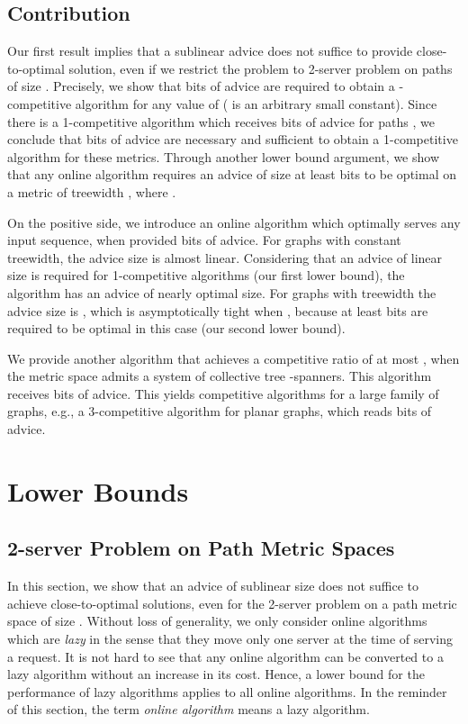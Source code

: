 \subsection{Contribution}
Our first result implies that a sublinear advice does not suffice to provide close-to-optimal solution, even if we restrict the problem to 2-server problem on paths of size . Precisely, we show that  bits of advice are required to obtain a -competitive algorithm for any value of  ( is an arbitrary small constant). Since there is a 1-competitive algorithm which receives  bits of advice for paths \cite{WAOA11}, we conclude that  bits of advice are necessary and sufficient to obtain a 1-competitive algorithm for these metrics.
Through another lower bound argument, we show that any online algorithm requires an advice of size at least  bits to be optimal on a metric of treewidth , where .

On the positive side, we introduce an online algorithm which optimally serves any input sequence, when provided  bits of advice. For graphs with constant treewidth, the advice size is almost linear. Considering that an advice of linear size is required for 1-competitive algorithms (our first lower bound), the algorithm has an advice of nearly optimal size.
For graphs with treewidth 
the advice size is , which is asymptotically tight when , because at least  bits are required to be optimal in this case (our second lower bound). 

We provide another algorithm that achieves a competitive ratio of at most , when the metric space admits a system of  collective tree -spanners. This 
algorithm receives  bits of advice. This yields competitive algorithms for a large family of graphs, e.g., a 3-competitive algorithm for planar graphs, which reads  bits of advice.



\section{Lower Bounds}

\subsection{2-server Problem on Path Metric Spaces}
In this section, we show that an advice of sublinear size does not suffice to achieve close-to-optimal solutions, even for the 2-server problem on a path metric space of size . 
Without loss of generality, we only consider online algorithms which are \textit{lazy} in the sense that they move only one server at the time of serving a request. 
It is not hard to see that any online algorithm can be converted to a lazy algorithm without an increase in its cost. Hence, a lower bound for the performance of lazy algorithms applies to all online algorithms. In the reminder of this section, the term {\it online algorithm} means a lazy algorithm.

